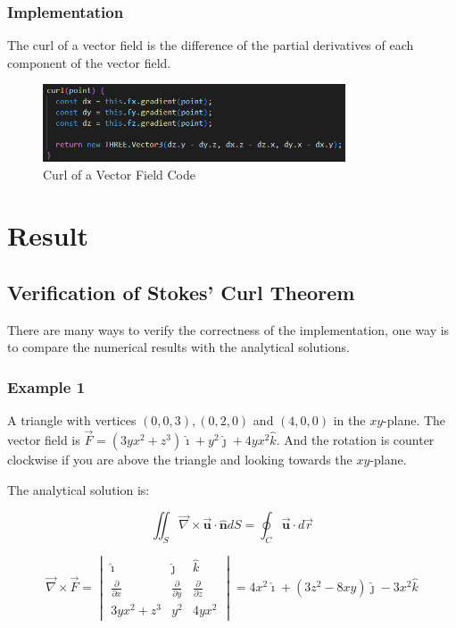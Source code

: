 \documentclass[12pt]{article}
\begin{document}
\subsubsection{Implementation}

The curl of a vector field is the difference of the partial derivatives of each component of the vector field.

\begin{figure}[H]
    \centering
    \includegraphics[width=0.8\textwidth]{images/curl.png}
    \caption{Curl of a Vector Field Code\cite{El-Deeb_PEU-218_Stokes_Threejs}}
\end{figure}

\newpage
\section{Result}

\subsection{Verification of Stokes' Curl Theorem}

There are many ways to verify the correctness of the implementation, one way is to compare the numerical results with the analytical solutions.

\subsubsection{Example 1}

A triangle with vertices \((0, 0, 3), (0, 2, 0)\) and \((4, 0, 0)\) in the \(x y\)-plane. The vector field is \(\vec{F}=\left(3 y x^2+z^3\right) \hat{\imath}+y^2 \hat{\jmath}+4 y x^2 \hat{k}\).
And the rotation is counter clockwise if you are above the triangle and looking towards the \(x y\)-plane.

The analytical solution is:

\[
    \iint_S \vec{\nabla} \times \overrightarrow{\boldsymbol{u}} \cdot \widehat{\boldsymbol{n}} d S=\oint_C \overrightarrow{\boldsymbol{u}} \cdot d \vec{r}
\]

\[
    \vec{\nabla} \times \vec{F} =
    \begin{vmatrix}
        \hat{\imath}                & \hat{\jmath}                & \hat{k}                     \\
        \frac{\partial}{\partial x} & \frac{\partial}{\partial y} & \frac{\partial}{\partial z} \\
        3 y x^2 + z^3               & y^2                         & 4 y x^2
    \end{vmatrix}
    = 4 x^2 \hat{\imath} + \left(3 z^2 - 8 x y\right)  \hat{\jmath} - 3 x^2 \hat{k}
\]
\end{document}
